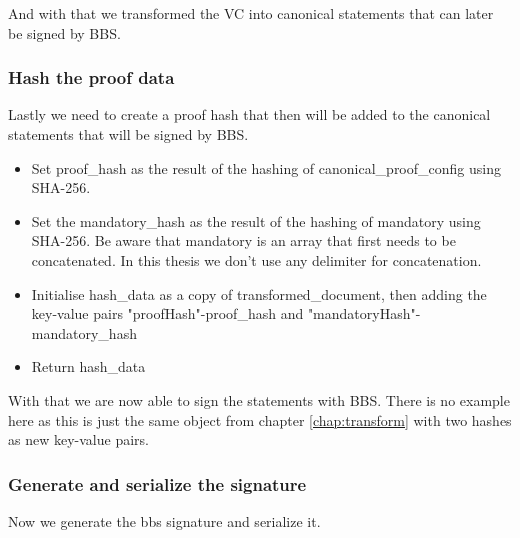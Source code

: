 \documentclass[
	a4paper               %
	,bibliography=totoc   %
	,listof=totoc         %
	,monolingual
	twoside=false,
]{bfhthesis}              %
\begin{document}
And with that we transformed the VC into canonical statements that can later be signed by BBS.

\subsubsection{Hash the proof data}

Lastly we need to create a proof hash that then will be added to the canonical statements that will be signed by BBS.

\begin{itemize}
	\item Set proof\_hash as the result of the hashing of canonical\_proof\_config using SHA-256.
	\item Set the mandatory\_hash as the result of the hashing of mandatory using SHA-256. Be aware that mandatory is an array that first needs to be concatenated. In this thesis we don't use any delimiter for concatenation. 
	\item Initialise hash\_data as a copy of transformed\_document, then adding the key-value pairs "proofHash"-proof\_hash and "mandatoryHash"-mandatory\_hash
	\item Return hash\_data
\end{itemize}

With that we are now able to sign the statements with BBS.
There is no example here as this is just the same object from chapter \ref{chap:transform} with two hashes as new key-value pairs.

\subsubsection{Generate and serialize the signature}

Now we generate the bbs signature and serialize it.
\end{document}
